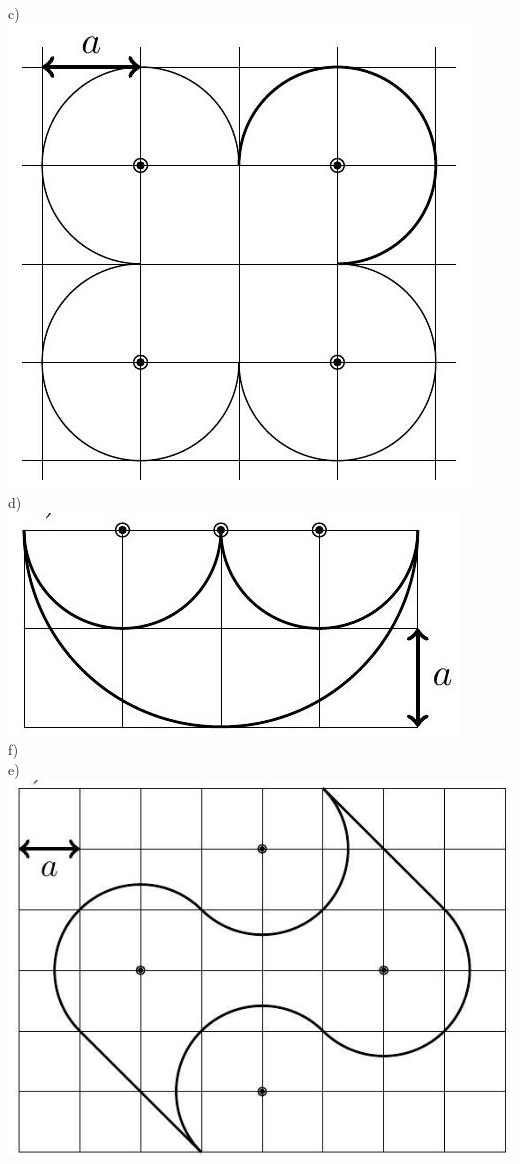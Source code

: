 \documentclass[10pt]{article}
\begin{document}
\begin{enumerate}
c)\\
\includegraphics[max width=\textwidth, center]{2024_11_21_e9b4faa005d5be2cc318g-060(4)}\\
d)\\
\includegraphics[max width=\textwidth, center]{2024_11_21_e9b4faa005d5be2cc318g-060(3)}\\
f)\\
e)\\
\includegraphics[max width=\textwidth, center]{2024_11_21_e9b4faa005d5be2cc318g-060(1)}\\

\end{enumerate}
\end{document}
